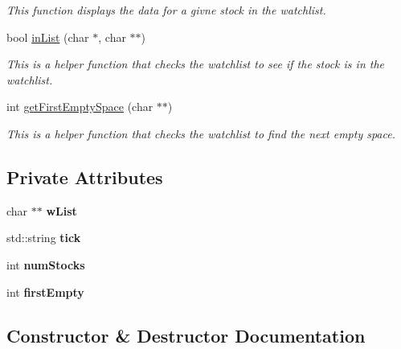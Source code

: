 \begin{DoxyCompactItemize}
\begin{DoxyCompactList}\small\item\em This function displays the data for a givne stock in the watchlist. \end{DoxyCompactList}\item 
bool \hyperlink{classwatchlist_a2ddba00bedd1e566b6ae416875cf1910}{in\+List} (char $\ast$, char $\ast$$\ast$)
\begin{DoxyCompactList}\small\item\em This is a helper function that checks the watchlist to see if the stock is in the watchlist. \end{DoxyCompactList}\item 
int \hyperlink{classwatchlist_ac05cc228f237f6ba3f0235ff454994ce}{get\+First\+Empty\+Space} (char $\ast$$\ast$)
\begin{DoxyCompactList}\small\item\em This is a helper function that checks the watchlist to find the next empty space. \end{DoxyCompactList}\end{DoxyCompactItemize}
\subsection*{Private Attributes}
\begin{DoxyCompactItemize}
\item 
\mbox{\label{classwatchlist_a8782311d3913e8f9de87a2173edf5fbd}} 
char $\ast$$\ast$ {\bfseries w\+List}
\item 
\mbox{\label{classwatchlist_a6a0c6b30cebb4590ea270b627e3a0181}} 
std\+::string {\bfseries tick}
\item 
\mbox{\label{classwatchlist_a584dfdf3cedb6d70b07432d24946967b}} 
int {\bfseries num\+Stocks}
\item 
\mbox{\label{classwatchlist_a38649ae900542165f3c247ca8f6f8ad4}} 
int {\bfseries first\+Empty}
\end{DoxyCompactItemize}


\subsection{Constructor \& Destructor Documentation}
\mbox{\label{classwatchlist_a8c630ba7e17201eb4c7e2cef8e5d6c92}} 
